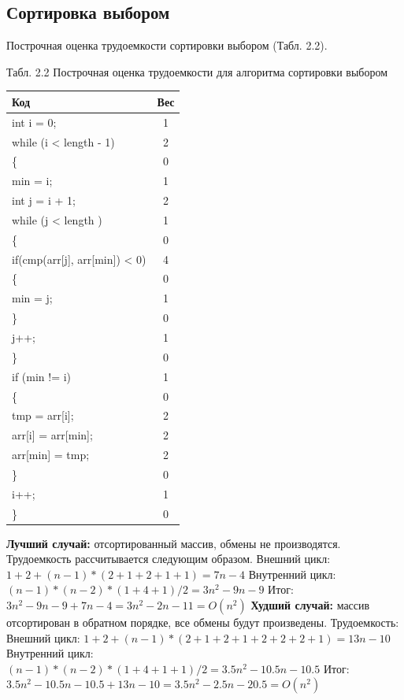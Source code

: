 \documentclass{report}
\begin{document}
\subsection{Сортировка выбором}
Построчная оценка трудоемкости сортировки выбором (Табл. 2.2).
\begin{center}
Табл. 2.2 Построчная оценка трудоемкости для алгоритма сортировки выбором

	\begin{tabular}{|l c|} 
 	\hline
	Код & Вес \\ [0.5ex] 
 	\hline
	int i = 0; & 1\\
 	\hline
	while (i < length - 1) & 2\\
	\hline
	\{ & 0\\
	\hline
	min = i; & 1\\
	\hline
	int j = i + 1; & 2\\
 	\hline
	while (j < length ) & 1\\
	\hline
	\{ & 0\\	
	\hline
	if(cmp(arr[j], arr[min]) < 0) & 4\\
	\hline
	\{ & 0\\
    \hline
    min = j; & 1\\
    \hline
    \} & 0\\
	\hline
	j++; & 1\\
	\hline
	\} & 0\\
	\hline
	if (min != i) & 1\\
	\hline
	\{ & 0\\
	\hline
	tmp = arr[i]; & 2\\
	\hline
    arr[i] = arr[min]; & 2\\
    \hline
    arr[min] = tmp; & 2\\
    \hline
	\} & 0\\
	\hline
	i++; & 1\\
	\hline
	\} & 0\\
	\hline
	\end{tabular}
\end{center}
\hspace*{5mm}
\textbf{Лучший случай:} отсортированный массив, обмены не производятся.
\newline
Трудоемкость рассчитывается следующим образом. 
\newline
Внешний цикл: $1 + 2 + (n - 1) * (2 + 1 + 2 + 1 + 1) = 7n - 4$
\newline
Внутренний цикл: $(n - 1) * (n - 2) * (1 + 4 + 1) / 2 = 3n^2 -9n -9$
\newline
Итог: $3n^2 -9n -9 + 7n - 4 = 3n^2 -2n - 11 = O(n^2)$
\newline
\hspace*{5mm}
\textbf{Худший случай:} массив отсортирован в обратном порядке, все обмены будут произведены. \newline
Трудоемкость: 
\newline
Внешний цикл: $1 + 2 + (n - 1) * (2 + 1 + 2 + 1 + 2 + 2 + 2 + 1) = 13n - 10$
\newline
Внутренний цикл: $(n - 1) * (n - 2) * (1 + 4 + 1 + 1) / 2 = 3.5n^2 -10.5n -10.5$
\newline
Итог: $3.5n^2 -10.5n -10.5 + 13n - 10 = 3.5n^2 -2.5n - 20.5 = O(n^2)$
\end{document}

